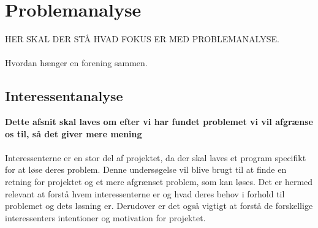 \chapter{Problemanalyse}\label{ch:ch2label}







HER SKAL DER STÅ HVAD FOKUS ER MED PROBLEMANALYSE. \\ \\
Hvordan hænger en forening sammen.




\section{Interessentanalyse}
\textbf{Dette afsnit skal laves om efter vi har fundet problemet vi vil afgrænse os til, så det giver mere mening}
\\ \\
Interessenterne er en stor del af projektet, da der skal laves et program specifikt for at løse deres problem. Denne undersøgelse vil blive brugt til at finde en retning for projektet og et mere afgrænset problem, som kan løses. Det er hermed relevant at forstå hvem interessenterne er og hvad deres behov i forhold til problemet og dets løsning er. Derudover er det også vigtigt at forstå de forskellige interessenters intentioner og motivation for projektet.

